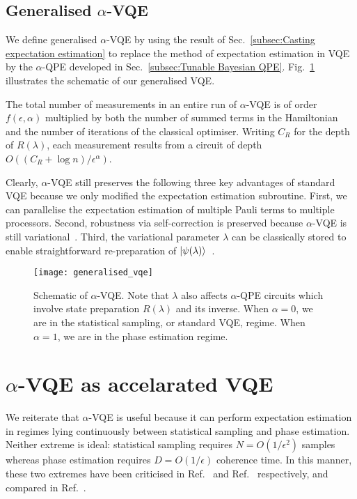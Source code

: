 \documentclass[twocolumn,
 reprint,
 amsmath,amssymb,
 aps,
 floatfix,
superscriptaddress
]{revtex4-1}
\begin{document}
\subsection{Generalised $\alpha$-VQE \label{subsec:Generalised alpha VQE}}

We define generalised $\alpha$-VQE by using the result of Sec.~\ref{subsec:Casting expectation estimation}
to replace the method of expectation estimation in VQE by the $\alpha$-QPE developed in Sec.~\ref{subsec:Tunable Bayesian QPE}. Fig.~\ref{Generalised VQE} illustrates the schematic of our generalised VQE.  

The total number of measurements in an entire run of $\alpha$-VQE is of order $f(\epsilon,\alpha)$ multiplied by both the number of summed terms in the Hamiltonian and the number of iterations of the classical optimiser. Writing $C_{R}$ for the depth of $R(\lambda)$, each measurement results from a circuit of depth $O((C_{R}+\log{n})/\epsilon^{\alpha})$. 

Clearly, $\alpha$-VQE still preserves the following three key advantages
of standard VQE because we
only modified the expectation estimation subroutine. First, we can parallelise the expectation estimation of multiple Pauli terms to multiple processors. Second, robustness via self-correction is preserved because $\alpha$-VQE
is still variational~\cite{OMalley2016,McClean2016}. Third, the variational parameter $\lambda$ can be classically stored to enable straightforward re-preparation of $\Ket{\psi(\lambda)}$~\cite{Wecker2015}. 

\begin{figure}[H]
\texttt{[image: generalised\_vqe]}
\centering{}\caption{{\scriptsize{}Schematic of $\alpha$-VQE. Note that $\lambda$
also affects $\alpha$-QPE circuits which involve state preparation $R(\lambda)$ and its inverse.
When $\alpha=0$, we are in the statistical sampling, or standard
VQE, regime. When $\alpha=1$, we are in the phase estimation regime.}}
\label{Generalised VQE}
\end{figure}

\section{\label{sec: Resource Comparisons} $\alpha$-VQE as accelarated VQE}

We reiterate that $\alpha$-VQE is useful because it can perform expectation estimation in regimes lying continuously between statistical sampling and phase estimation. Neither extreme is ideal: statistical sampling requires $N=O(1/\epsilon^{2})$
samples whereas phase estimation requires $D=O(1/\epsilon)$ coherence
time. In this manner, these two extremes have been criticised in Ref.~\cite{Paesani2017} and Ref.~\cite{Peruzzo2014,McClean2016} respectively, and compared in Ref.~\cite{Wecker2015}. 
\end{document}
